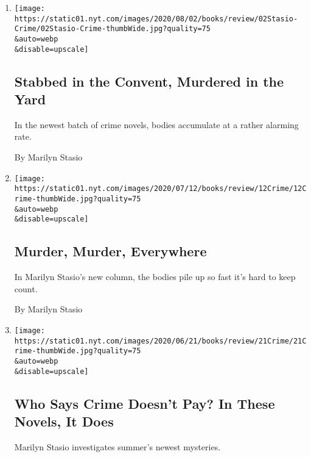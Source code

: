\begin{enumerate}
\def\labelenumi{\arabic{enumi}.}
\item
  \href{/2020/07/31/books/review/crime-fiction-megan-miranda.html}{}

  \texttt{[image: https://static01.nyt.com/images/2020/08/02/books/review/02Stasio-Crime/02Stasio-Crime-thumbWide.jpg?quality=75\\\&auto=webp\\\&disable=upscale]}

  \hypertarget{stabbed-in-the-convent-murdered-in-the-yard}{%
  \subsection{Stabbed in the Convent, Murdered in the
  Yard}\label{stabbed-in-the-convent-murdered-in-the-yard}}

  In the newest batch of crime novels, bodies accumulate at a rather
  alarming rate.

  By Marilyn Stasio
\item
  \href{/2020/07/10/books/review/crime-fiction-jessica-barry-dont-turn-around.html}{}

  \texttt{[image: https://static01.nyt.com/images/2020/07/12/books/review/12Crime/12Crime-thumbWide.jpg?quality=75\\\&auto=webp\\\&disable=upscale]}

  \hypertarget{murder-murder-everywhere}{%
  \subsection{Murder, Murder,
  Everywhere}\label{murder-murder-everywhere}}

  In Marilyn Stasio's new column, the bodies pile up so fast it's hard
  to keep count.

  By Marilyn Stasio
\item
  \href{/2020/06/18/books/review/crime-fiction-james-lee-burke-jeffery-deaver.html}{}

  \texttt{[image: https://static01.nyt.com/images/2020/06/21/books/review/21Crime/21Crime-thumbWide.jpg?quality=75\\\&auto=webp\\\&disable=upscale]}

  \hypertarget{who-says-crime-doesnt-pay-in-these-novels-it-does}{%
  \subsection{Who Says Crime Doesn't Pay? In These Novels, It
  Does}\label{who-says-crime-doesnt-pay-in-these-novels-it-does}}

  Marilyn Stasio investigates summer's newest mysteries.


\end{enumerate}
